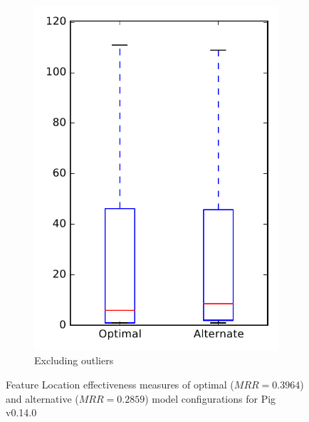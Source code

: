 \begin{figure}
\begin{subfigure}{.4\textwidth}
        \includegraphics[height=0.4\textheight]{figures/combo/flt_rq1_pig_no_outlier}
        \caption{Excluding outliers}\label{fig:combo:flt:rq1:pig_no_outlier}
    \end{subfigure}
\caption{Feature Location effectiveness measures of optimal ($MRR=0.3964$) and alternative ($MRR=0.2859$) model configurations for Pig v0.14.0}
\label{fig:combo:flt:rq1:pig}
\end{figure}
